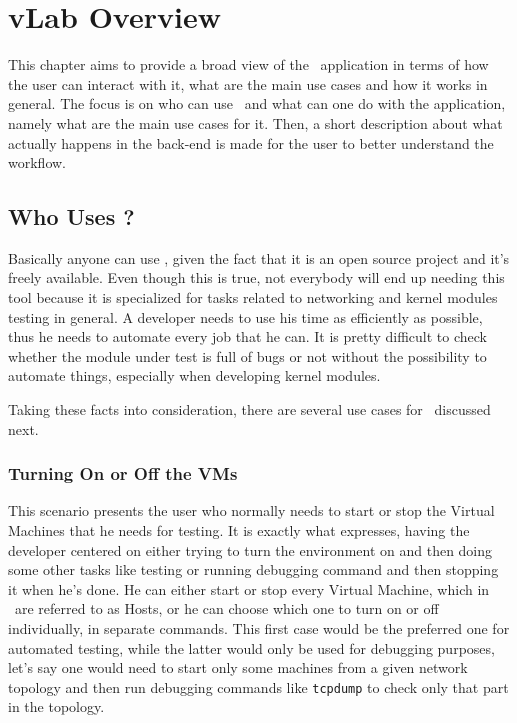 \chapter{vLab Overview}
\label{chapter:Chapter 3}

This chapter aims to provide a broad view of the \project\ application in terms of how the user can interact with it, what are the main use cases and how it works in general.
The focus is on who can use \project\ and what can one do with the application, namely what are the main use cases for it.
Then, a short description about what actually happens in the back-end is made for the user to better understand the workflow.

\section{Who Uses \project?}
\label{sec:who-uses-vlab}

Basically anyone can use \project, given the fact that it is an open source project and it's freely available.
Even though this is true, not everybody will end up needing this tool because it is specialized for tasks related to networking and kernel modules testing in general.
A developer needs to use his time as efficiently as possible, thus he needs to automate every job that he can.
It is pretty difficult to check whether the module under test is full of bugs or not without the possibility to automate things, especially when developing kernel modules.

Taking these facts into consideration, there are several use cases for \project\ discussed next.

\subsection{Turning On or Off the VMs}
\label{sub-sec:turning-on-off-vms}


This scenario presents the user who normally needs to start or stop the Virtual Machines that he needs for testing.
It is exactly what  expresses, having the developer centered on either trying to turn the environment on and then doing some other tasks like testing or running debugging command and then stopping it when he's done.
He can either start or stop every Virtual Machine, which in \project\ are referred to as Hosts, or he can choose which one to turn on or off individually, in separate commands.
This first case would be the preferred one for automated testing, while the latter would only be used for debugging purposes, let's say one would need to start only some machines from a given network topology and then run debugging commands like \texttt{tcpdump} to check only that part in the topology.

